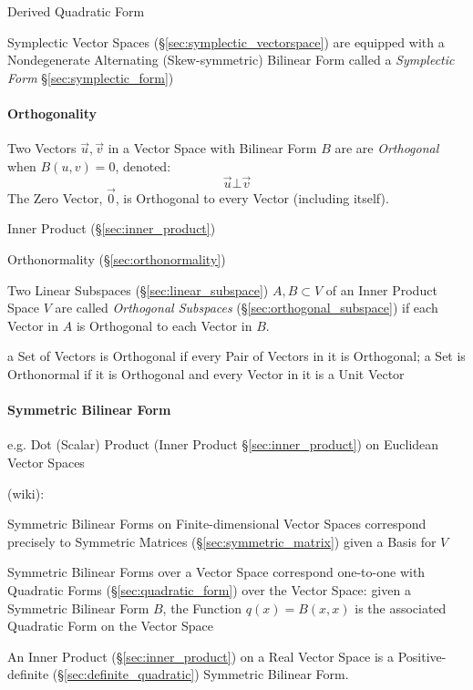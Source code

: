 Derived Quadratic Form

Symplectic Vector Spaces (\S\ref{sec:symplectic_vectorspace}) are equipped with
a Nondegenerate Alternating (Skew-symmetric) Bilinear Form called a
\emph{Symplectic Form} \S\ref{sec:symplectic_form})



\paragraph{Orthogonality}\label{sec:orthogonality}\hfill

Two Vectors $\vec{u}, \vec{v}$ in a Vector Space with Bilinear Form $B$
are are \emph{Orthogonal} when $B(u,v) = 0$, denoted:
\[
  \vec{u} \bot \vec{v}
\]
The Zero Vector, $\vec{0}$, is Orthogonal to every Vector (including itself).

\fist Inner Product (\S\ref{sec:inner_product})

\fist Orthonormality (\S\ref{sec:orthonormality})

Two Linear Subspaces (\S\ref{sec:linear_subspace}) $A, B \subset V$ of an Inner
Product Space $V$ are called \emph{Orthogonal Subspaces}
(\S\ref{sec:orthogonal_subspace}) if each Vector in $A$ is Orthogonal to each
Vector in $B$.

a Set of Vectors is Orthogonal if every Pair of Vectors in it is Orthogonal; a
Set is Orthonormal if it is Orthogonal and every Vector in it is a Unit Vector



\paragraph{Symmetric Bilinear Form}\label{sec:symmetric_bilinear}\hfill

e.g. Dot (Scalar) Product (Inner Product \S\ref{sec:inner_product}) on
Euclidean Vector Spaces

(wiki):

Symmetric Bilinear Forms on Finite-dimensional Vector Spaces correspond
precisely to Symmetric Matrices (\S\ref{sec:symmetric_matrix}) given a Basis
for $V$

Symmetric Bilinear Forms over a Vector Space correspond one-to-one with
Quadratic Forms (\S\ref{sec:quadratic_form}) over the Vector Space: given a
Symmetric Bilinear Form $B$, the Function $q(x) = B(x,x)$ is the associated
Quadratic Form on the Vector Space

An Inner Product (\S\ref{sec:inner_product}) on a Real Vector Space is
a Positive-definite (\S\ref{sec:definite_quadratic}) Symmetric
Bilinear Form.

